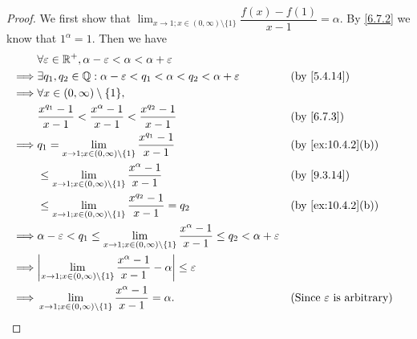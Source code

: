 \begin{proof}
  We first show that \(\lim_{x \to 1 ; x \in (0, \infty) \setminus \{1\}} \dfrac{f(x) - f(1)}{x - 1} = \alpha\).
  By \cref{6.7.2} we know that \(1^{\alpha} = 1\).
  Then we have
  \begin{align*}
             & \forall \varepsilon \in \R^+, \alpha - \varepsilon < \alpha < \alpha + \varepsilon                                                                                                                \\
    \implies & \exists q_1, q_2 \in \Q : \alpha - \varepsilon < q_1 < \alpha < q_2 < \alpha + \varepsilon                                                       &  & \by{5.4.14}                                 \\
    \implies & \forall x \in (0, \infty) \setminus \{1\},                                                                                                                                                        \\
             & \dfrac{x^{q_1} - 1}{x - 1} < \dfrac{x^{\alpha} - 1}{x - 1} < \dfrac{x^{q_2} - 1}{x - 1}                                                          &  & \by{6.7.3}                                  \\
    \implies & q_1 = \lim_{x \to 1 ; x \in (0, \infty) \setminus \{1\}} \dfrac{x^{q_1} - 1}{x - 1}                                                              &  & \text{(by \cref{ex:10.4.2}(b))}             \\
             & \leq \lim_{x \to 1 ; x \in (0, \infty) \setminus \{1\}} \dfrac{x^{\alpha} - 1}{x - 1}                                                            &  & \by{9.3.14}                                 \\
             & \leq \lim_{x \to 1 ; x \in (0, \infty) \setminus \{1\}} \dfrac{x^{q_2} - 1}{x - 1} = q_2                                                         &  & \text{(by \cref{ex:10.4.2}(b))}             \\
    \implies & \alpha - \varepsilon < q_1 \leq \lim_{x \to 1 ; x \in (0, \infty) \setminus \{1\}} \dfrac{x^{\alpha} - 1}{x - 1} \leq q_2 < \alpha + \varepsilon                                                  \\
    \implies & \abs{\lim_{x \to 1 ; x \in (0, \infty) \setminus \{1\}} \dfrac{x^{\alpha} - 1}{x - 1} - \alpha} \leq \varepsilon                                                                                  \\
    \implies & \lim_{x \to 1 ; x \in (0, \infty) \setminus \{1\}} \dfrac{x^{\alpha} - 1}{x - 1} = \alpha.                                                       &  & \text{(Since \(\varepsilon\) is arbitrary)}
  \end{align*}


\end{proof}

